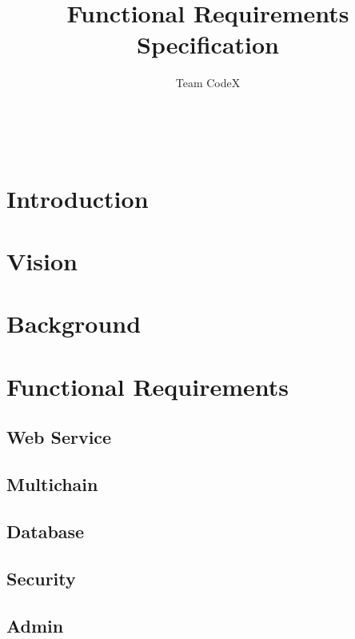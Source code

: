\documentclass[11pt]{article}
\author{Team CodeX}
\title{Functional Requirements Specification}
\begin{document}
	\setlength{\parskip}{6pt}
	
	
	
	\renewcommand{\thesection}{\arabic{section}}
	\newpage
	
	\tableofcontents
	
	\textsc{}\\[1cm]
	
	\newpage
	
	\section{Introduction}
		
	
	\section{Vision}
		
	
	\section{Background}
		
		\newpage
		
	\section{Functional Requirements}

	\subsection{Web Service}
		
		\newpage
		
	\subsection{Multichain}
		
		\newpage
		
	\subsection{Database}
		
		\newpage
		
	\subsection{Security}
		
		\newpage
		
	\subsection{Admin}
		
		\newpage
		
\end{document}
